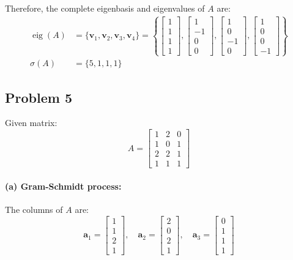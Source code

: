 Therefore, the complete eigenbasis and eigenvalues of $A$ are:
\begin{align*}
    \operatorname{eig}(A) & = \{\mathbf{v}_1, \mathbf{v}_2, \mathbf{v}_3, \mathbf{v}_4\} = \left\{\begin{bmatrix} 1 \\ 1 \\ 1 \\ 1 \end{bmatrix}, \begin{bmatrix} 1 \\ -1 \\ 0 \\ 0 \end{bmatrix}, \begin{bmatrix} 1 \\ 0 \\ -1 \\ 0 \end{bmatrix}, \begin{bmatrix} 1 \\ 0 \\ 0 \\ -1 \end{bmatrix}\right\} \\
    \sigma(A)             & = \{5, 1, 1, 1\}
\end{align*}

\subsection{Problem 5}

Given matrix:
\[
    A = \begin{bmatrix}
        1 & 2 & 0 \\
        1 & 0 & 1 \\
        2 & 2 & 1 \\
        1 & 1 & 1
    \end{bmatrix}
\]

\paragraph{(a) Gram-Schmidt process:}
The columns of $A$ are:
\[
    \mathbf{a}_1 = \begin{bmatrix} 1 \\ 1 \\ 2 \\ 1 \end{bmatrix},\quad
    \mathbf{a}_2 = \begin{bmatrix} 2 \\ 0 \\ 2 \\ 1 \end{bmatrix},\quad
    \mathbf{a}_3 = \begin{bmatrix} 0 \\ 1 \\ 1 \\ 1 \end{bmatrix}
\]


